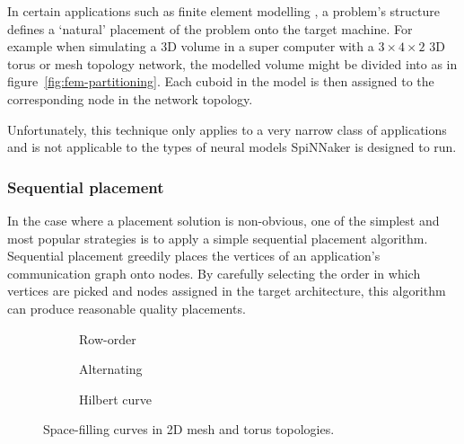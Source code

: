 				In certain applications such as finite element modelling
				\cite{bermejo13}, a problem's structure defines a `natural' placement
				of the problem onto the target machine. For example when simulating a
				3D volume in a super computer with a $3 \times 4 \times 2$ 3D torus or
				mesh topology network, the modelled volume might be divided into as in
				figure~\ref{fig:fem-partitioning}. Each cuboid in the model is then
				assigned to the corresponding node in the network topology.
				
				Unfortunately, this technique only applies to a very narrow class of
				applications and is not applicable to the types of neural models
				SpiNNaker is designed to run.
			
			\subsubsection{Sequential placement}
				
				In the case where a placement solution is non-obvious, one of the
				simplest and most popular strategies is to apply a simple sequential
				placement algorithm. Sequential placement greedily places the vertices
				of an application's communication graph onto nodes. By carefully
				selecting the order in which vertices are picked and nodes assigned in
				the target architecture, this algorithm can produce reasonable quality
				placements.
				
				\begin{figure}
					\center
					\begin{subfigure}{0.32\linewidth}
						\center
						\caption{Row-order}
						\label{fig:sequential-row-order}
					\end{subfigure}
					\begin{subfigure}{0.32\linewidth}
						\center
						\caption{Alternating}
						\label{fig:sequential-alternating}
					\end{subfigure}
					\begin{subfigure}{0.32\linewidth}
						\center
						\caption{Hilbert curve}
						\label{fig:sequential-hilbert}
					\end{subfigure}
					
					\caption{Space-filling curves in 2D mesh and torus topologies.}
					\label{fig:sequential}
				\end{figure}
				
